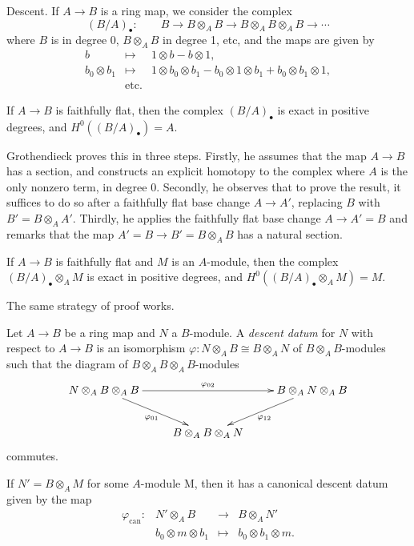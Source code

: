 \medskip\noindent
Descent. If $A \to B$ is a ring map, we consider the complex
$$
(B/A)_\bullet : \qquad B \to B\otimes_A B \to B\otimes_A B \otimes_A B \to 
\cdots
$$
where $B$ is in degree 0, $B\otimes_A B$ in degree 1, etc, and the maps are 
given by 
\begin{eqnarray*}
b & \mapsto  & 1 \otimes b - b \otimes 1, \\
b_0 \otimes b_1 &  \mapsto & 1 \otimes b_0 \otimes b_1 - b_0 \otimes 1 \otimes 
b_1 + b_0 \otimes b_1 \otimes 1, \\
& \text{etc.}
\end{eqnarray*}

\begin{lemma}
If $A \to B$ is faithfully flat, then the complex $(B/A)_\bullet$ is exact in 
positive degrees, and $H^0((B/A)_\bullet) = A$.
\end{lemma}

\noindent
Grothendieck proves this in three steps. Firstly, he assumes that the map $A 
\to B$ has a section, and constructs an explicit homotopy to the complex where 
$A$ is the only nonzero term, in degree 0. Secondly, he observes that to prove 
the result, it suffices to do so after a faithfully flat base change $A \to 
A'$,  replacing $B$ with $B' = B \otimes_A A'$. Thirdly, he applies the 
faithfully flat base change $A \to A' =B$ and remarks that the map $A' = B \to 
B' = B\otimes_A B$ has a natural section.

\begin{lemma} \label{lem:descentForModules}
If $A \to B$ is faithfully flat and $M$ is an $A$-module, then the
complex $(B/A)_\bullet \otimes_A M$ is exact in positive degrees, and 
$H^0((B/A)_\bullet \otimes_A M) = M$.
\end{lemma}

\noindent
The same strategy of proof works.

\begin{definition}
Let $A \to B$ be a ring map and $N$ a $B$-module. A \emph{descent datum} for 
$N$ with respect to $A \to B$ is an isomorphism $\varphi: N\otimes_A B \cong 
B\otimes_A N$ of $B\otimes_A B$-modules such that the diagram of $B\otimes_A B 
\otimes_A B$-modules
$$
\xymatrix{
{N \otimes_A  B \otimes_A B} \ar_{\varphi_{01}}[dr] \ar^{\varphi_{02}}[rr] & & 
{B \otimes_A  N \otimes_A B}\ar^{\varphi_{12}}[dl] \\
& {B \otimes_A  B \otimes_A N}  
}
$$ 
commutes.
\end{definition}

\noindent
If $N' = B \otimes_A M$ for some $A$-module M, then it has a canonical descent 
datum given by the map
$$
\begin{array}{rrcl}
 \varphi_\text{can}: & N' \otimes_A B & \to & B \otimes_A N' \\
& b_0 \otimes m \otimes b_1 & \mapsto & b_0 \otimes b_1 \otimes m.
\end{array}
$$

